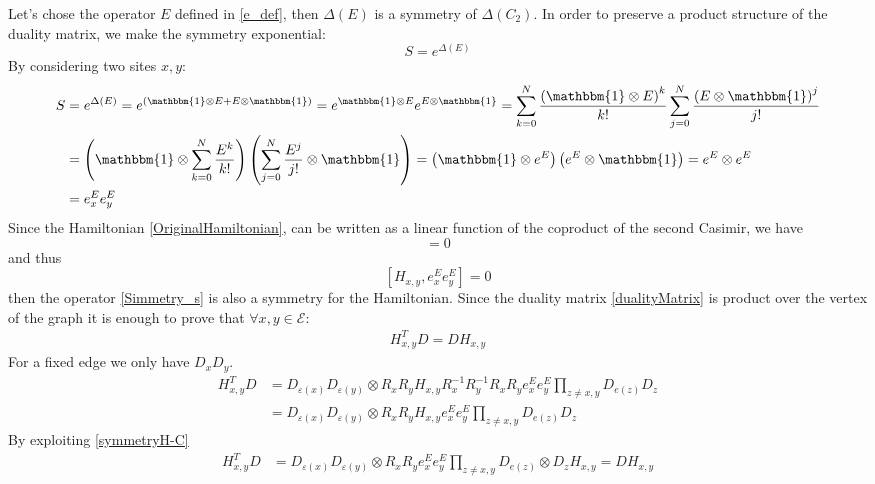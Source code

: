 \documentclass[11pt]{article}
\numberwithin{equation}{subsection}
\begin{document}
Let's chose the operator $E$ defined in \eqref{e_def}, then $\Delta(E)$ is a symmetry of $\Delta(C_{2})$.
In order to preserve a product structure of the duality matrix, we make the symmetry exponential:
\begin{equation}\label{Simmetry_s}
	S=e^{\Delta(E)}
\end{equation}
By considering two sites $x,y$:
\begin{equation}
	\begin{split}
		S&=e^{\Delta(E)}=e^{(\mathbbm{1}\otimes E+E\otimes \mathbbm{1})}=e^{\mathbbm{1}\otimes E}e^{E\otimes \mathbbm{1}}=\sum_{k=0}^{N}\frac{\left(\mathbbm{1}\otimes E\right)^{k}}{k!}\sum_{j=0}^{N}\frac{\left(E\otimes \mathbbm{1}\right)^{j}}{j!}
		\\&=
		\left(\mathbbm{1}\otimes \sum_{k=0}^{N}\frac{E^{k}}{k!}\right)\left(\sum_{j=0}^{N}\frac{E^{j}}{j!}\otimes \mathbbm{1}\right)=\left(\mathbbm{1}\otimes e^{E}\right)\left(e^{E}\otimes \mathbbm{1}\right)=e^{E}\otimes e^{E}
		\\&=e_{x}^{E} e^{E}_{y}
	\end{split}
\end{equation}
Since the Hamiltonian \eqref{OriginalHamiltonian}, can be written as a linear function of the coproduct of the second Casimir, we have \begin{equation}[H_{x,y},e^{\Delta (C_{2})}]=0\end{equation} and thus \begin{equation}\label{symmetryH-C}[H_{x,y},e^{E}_{x}e^{E}_{y}]=0\end{equation} then the operator \eqref{Simmetry_s} is also a symmetry for the Hamiltonian. 
Since the duality matrix \eqref{dualityMatrix} is product over the vertex of the graph it is enough to prove that $\forall x,y\in \mathcal{E}$:
\begin{align}
	H_{x,y}^{T}D=DH_{x,y}\label{bulkDuality}
\end{align}
For a fixed edge we only have $D_{x}D_{y}$. 
\begin{align*}
	H_{x,y}^{T}D&=D_{\varepsilon(x)}D_{\varepsilon(y)}\otimes R_{x}R_{y}H_{x,y}R_{x}^{-1}R_{y}^{-1}R_{x}R_{y}e^{E}_{x}e^{E}_{y}\prod_{z\neq x,y}D_{e(z)}D_{z}
	\\&=
	D_{\varepsilon(x)}D_{\varepsilon(y)}\otimes R_{x}R_{y}H_{x,y}e^{E}_{x}e^{E}_{y}\prod_{z\neq x,y}D_{e(z)}D_{z}
\end{align*} 
By exploiting \eqref{symmetryH-C}
\begin{align*}
	H_{x,y}^{T}D&=	D_{\varepsilon(x)}D_{\varepsilon(y)}\otimes R_{x}R_{y}e^{E}_{x}e^{E}_{y}\prod_{z\neq x,y}D_{e(z)}\otimes D_{z}H_{x,y}=
	DH_{x,y}
\end{align*}
\end{document}
